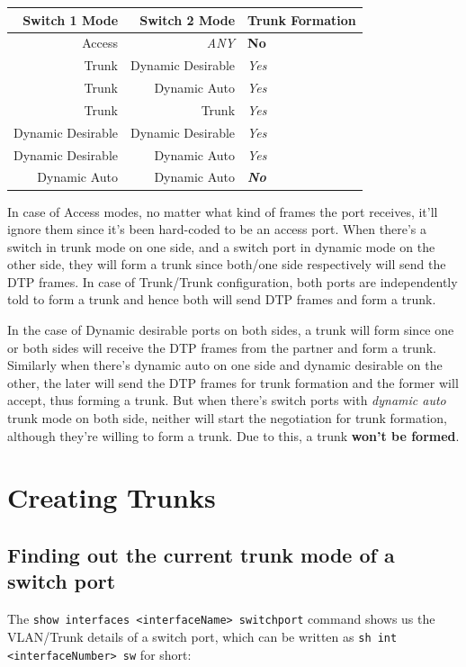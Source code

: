 \noindent
\begin{center}
	\begin{tabular}{rrl}
		\toprule
		\textbf{Switch 1 Mode} &\textbf{Switch 2 Mode}&\textbf{Trunk Formation} \\
		\midrule
		Access &\textit{ANY} &\textbf{No}\\
		Trunk &Dynamic Desirable &\textit{Yes}\\
		Trunk &Dynamic Auto &\textit{Yes}\\
		Trunk &Trunk &\textit{Yes}\\
		Dynamic Desirable &Dynamic Desirable &\textit{Yes}\\
		Dynamic Desirable &Dynamic Auto &\textit{Yes}\\
		Dynamic Auto &Dynamic Auto &\textbf{\textit{No}}\\
		\bottomrule
	\end{tabular}
\end{center}

\noindent
In case of Access modes, no matter what kind of frames the port receives, it'll ignore them since it's been hard-coded to be an access port. When there's a switch in trunk mode on one side, and a switch port in dynamic mode on the other side, they will form a trunk since both/one side respectively will send the DTP frames. In case of Trunk/Trunk configuration, both ports are independently told to form a trunk and hence both will send DTP frames and form a trunk. 

In the case of Dynamic desirable ports on both sides, a trunk will form since one or both sides will receive the DTP frames from the partner and form a trunk. Similarly when there's dynamic auto on one side and dynamic desirable on the other, the later will send the DTP frames for trunk formation and the former will accept, thus forming a trunk. But when there's switch ports with \textit{dynamic auto} trunk mode on both side, neither will start the negotiation for trunk formation, although they're willing to form a trunk. Due to this, a trunk \textbf{won't be formed}. 

\section{Creating Trunks}
\subsection{Finding out the current trunk mode of a switch port}
The \verb|show interfaces <interfaceName> switchport| command shows us the VLAN/Trunk details of a switch port, which can be written as \verb|sh int <interfaceNumber> sw| for short: 

